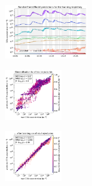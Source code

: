 \begin{figure}[H]
    \begin{subfigure}
    \centering
    \includegraphics[width=0.4\textwidth]{prediction/figures/models/randomforestmodel-training-prediction.pdf}
    \end{subfigure}
    \begin{subfigure}
    \centering
    \includegraphics[width=0.275\textwidth]{prediction/figures/models/randomforestmodel-test-generalisation.pdf}
    \end{subfigure}
    \begin{subfigure}
    \centering
    \includegraphics[width=0.275\textwidth]{prediction/figures/models/randomforestmodel-test-prediction.pdf}
    \end{subfigure}


\end{figure}
